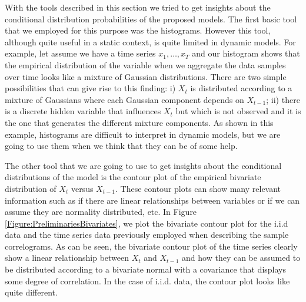 With the tools described in this section we tried to get insights about the conditional distribution probabilities  of the proposed models. The first basic tool that we employed for this purpose was the histograms. However this tool, although quite useful in a static context, is quite limited in dynamic models. For example, let assume we have a time series $x_1,\ldots, x_T$ and our histogram shows that the empirical distribution of the variable when we aggregate the data samples over time looks like a mixture of Gaussian distributions. There are two simple possibilities that can give rise to this finding: i)  $X_t$ is distributed according to a mixture of Gaussians where each Gaussian component depends on $X_{t-1}$; ii) there is a discrete hidden variable that influences $X_{t}$ but which is not observed and it is the one that generates the different mixture components.  As shown in this example, histograms are difficult to interpret in dynamic models, but we are going to use them when we think that they can be of some help. 

The other tool that we are going to use to get insights about the conditional distributions of the model is the contour plot of the empirical bivariate distribution of $X_t$ versus $X_{t-1}$.  These contour plots can show many relevant information such as if there are linear relationships between variables or if we can assume they are normality distributed, etc. In Figure \ref{Figure:PreliminariesBivariates}, we plot the bivariate contour plot for the i.i.d data and the time series data previously employed when describing the sample correlograms. As can be seen, the bivariate contour plot of the time series clearly show a linear relationship between $X_t$ and $X_{t-1}$  and how they can be assumed to be distributed according to a bivariate normal with a covariance that displays some degree of correlation. In the case of i.i.d. data, the contour plot looks like quite different. 


